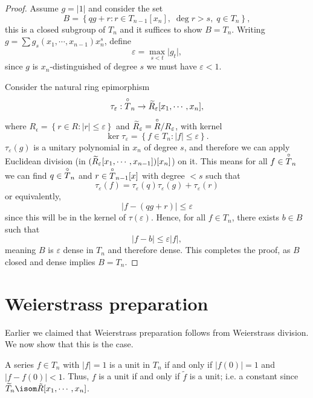 \begin{proof}
  Assume $g = \lvert 1 \rvert$ and consider the set
  \[
    B = \left\{ qg + r : r \in T_{n-1}[x_n], \; \deg r > s, \; q \in T_n \right\},
  \]
  this is a closed subgroup of $T_n$ and it suffices to show $B = T_n$.
  Writing $g = \sum g_s (x_1, \cdots, x_{n-1}) x_n^s$, define
  \[
    \varepsilon = \max_{s < t} \lvert g_t \rvert,
  \]
  since $g$ is $x_n$-distinguished of degree $s$ we must have $\varepsilon < 1$.

  Consider the natural ring epimorphism
  \[
    \tau_\varepsilon : \overset{\circ}{T}_n \to \widetilde{R}_\varepsilon [x_1, \cdots, x_n],
  \]
  where $R_\epsilon = \left\{ r \in R : \lvert r \rvert \leq \varepsilon \right\}$ and $\widetilde{R}_\varepsilon
  = \overset{\circ}{R} / R_\varepsilon$, with kernel
  \[
    \ker \tau_\varepsilon = \left\{ f \in T_n : \lvert f \rvert \leq \varepsilon \right\}.
  \]
  $\tau_\varepsilon (g)$ is a unitary polynomial in $x_n$ of degree $s$, and therefore we can apply
  Euclidean division (in $(\widetilde{R}_\varepsilon [x_1, \cdots, x_{n-1}]) [x_n]$) on it.
  This means for all $f \in \overset{\circ}{T}_n$ we can find $q \in \overset{\circ}{T}_n$ and $r \in \overset{\circ}{T}_{n-1}[x]$ with
  degree $ < s$ such that
  \[
    \tau_\varepsilon (f) = \tau_\varepsilon (q) \tau_\varepsilon (g) + \tau_\varepsilon (r)
  \]
  or equivalently,
  \[
    \lvert f - (qg + r) \rvert \leq \varepsilon
  \]
  since this will be in the kernel of $\tau (\varepsilon)$.
  Hence, for all $f \in T_n$, there exists $b \in B$ such that
  \[
    \lvert f - b \rvert \leq \varepsilon \lvert f \rvert,
  \]
  meaning $B$ is $\varepsilon$ dense in $T_n$ and therefore dense.
  This completes the proof, as $B$ closed and dense implies $B = T_n$.
\end{proof}

\section{Weierstrass preparation}

Earlier we claimed that Weierstrass preparation follows from Weierstrass division. We now show that
this is the case.

\begin{lemma}
  A series $f \in T_n$ with $\lvert f \rvert = 1$ is a unit in $T_n$ if and only if $\lvert f (0) \rvert = 1$
  and $\lvert f - f(0) \rvert < 1$. Thus, $f$ is a unit if and only if $\tilde{f}$ is a unit;
  i.e. a constant since $\res{T}_{n} \isom \tilde{R}[x_1, \cdots, x_{n}]$.
\end{lemma}


